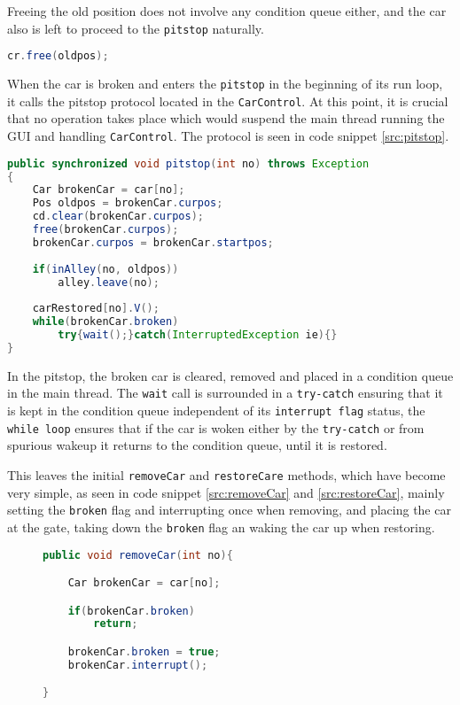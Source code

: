 Freeing the old position does not involve any condition queue either, and the car also is left to proceed to the \texttt{pitstop} naturally.

\begin{lstlisting}[language=java]
cr.free(oldpos);
\end{lstlisting}


When the car is broken and enters the \texttt{pitstop} in the beginning of its run loop, it calls the pitstop protocol located in the \texttt{CarControl}. At this point, it is crucial that no operation takes place which would suspend the main thread running the GUI and handling \texttt{CarControl}. The protocol is seen in code snippet \ref{src:pitstop}.

\begin{lstlisting}[language=java, label=src:pitstop]
public synchronized void pitstop(int no) throws Exception
{
    Car brokenCar = car[no];
    Pos oldpos = brokenCar.curpos;
    cd.clear(brokenCar.curpos);
    free(brokenCar.curpos);
    brokenCar.curpos = brokenCar.startpos;
    
    if(inAlley(no, oldpos))
        alley.leave(no);
    
    carRestored[no].V();
    while(brokenCar.broken)
        try{wait();}catch(InterruptedException ie){}
}
\end{lstlisting}

In the pitstop, the broken car is cleared, removed and placed in a condition queue in the main thread. The \texttt{wait} call is surrounded in a \texttt{try-catch} ensuring that it is kept in the condition queue independent of its \texttt{interrupt flag} status, the \texttt{while loop} ensures that if the car is woken either by the \texttt{try-catch} or from spurious wakeup it returns to the condition queue, until it is restored.

This leaves the initial \texttt{removeCar} and \texttt{restoreCare} methods, which have become very simple, as seen in code snippet \ref{src:removeCar} and \ref{src:restoreCar}, mainly setting the \texttt{broken} flag and interrupting once when removing, and placing the car at the gate, taking down the \texttt{broken} flag an waking the car up when restoring.

\begin{figure}[H]
\begin{lstlisting}[language=java, caption=removeCar method, label=src:removeCar]
public void removeCar(int no){ 

    Car brokenCar = car[no];

    if(brokenCar.broken)
        return;

    brokenCar.broken = true;
    brokenCar.interrupt();

}
\end{lstlisting}
\end{figure}

